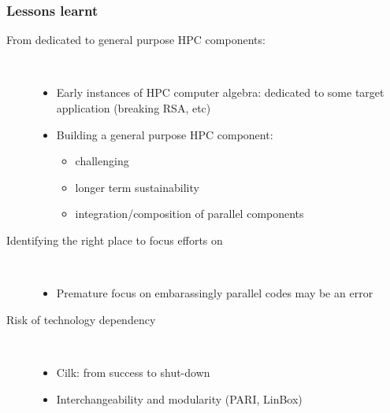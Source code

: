 \documentclass{beamer}
\begin{document}
\begin{frame}
  \frametitle{Lessons learnt}

  \begin{description}
    \item[From dedicated to general purpose HPC components:]\
      \begin{itemize}
      \item  Early instances of HPC computer algebra: dedicated to some target
        application (breaking RSA, etc)
      \item Building a general purpose HPC component:
        \begin{itemize}
        \item challenging
        \item longer term sustainability
        \item integration/composition of parallel components
        \end{itemize}
      \end{itemize}
    \item[Identifying the right place to focus efforts on]\
      \begin{itemize}
      \item Premature focus on  embarassingly parallel codes may be an error
      \end{itemize}
    \item[Risk of technology dependency]\
      \begin{itemize}
      \item Cilk: from success to shut-down
      \item Interchangeability and modularity (PARI, LinBox)
      \end{itemize}
      \end{description}
  \end{frame}
\end{document}
